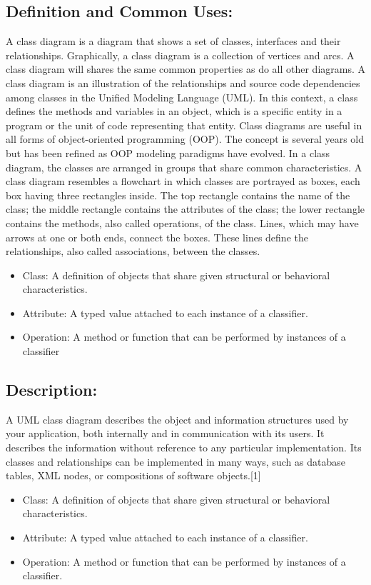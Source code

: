 \subsection{Definition and Common Uses:}
A class diagram is a diagram that shows a set of classes, interfaces and their relationships. Graphically, a class diagram is a collection of vertices and arcs. A class diagram will shares the same common properties as do all other diagrams.
A class diagram is an illustration of the relationships and source code dependencies among classes in the Unified Modeling Language (UML). In this context, a class defines the methods and variables in an object, which is a specific entity in a program or the unit of code representing that entity. Class diagrams are useful in all forms of object-oriented programming (OOP). The concept is several years old but has been refined as OOP modeling paradigms have evolved.
In a class diagram, the classes are arranged in groups that share common characteristics. A class diagram resembles a flowchart in which classes are portrayed as boxes, each box having three rectangles inside. The top rectangle contains the name of the class; the middle rectangle contains the attributes of the class; the lower rectangle contains the methods, also called operations, of the class. Lines, which may have arrows at one or both ends, connect the boxes. These lines define the relationships, also called associations, between the classes.
\begin{itemize}
\item Class: A definition of objects that share given structural or behavioral characteristics.
\item Attribute: A typed value attached to each instance of a classifier.
\item Operation: A method or function that can be performed by instances of a classifier
\end{itemize}

\subsection{Description:}
A UML class diagram describes the object and information structures used by your application, both internally and in communication with its users. It describes the information without reference to any particular implementation. Its classes and relationships can be implemented in many ways, such as database tables, XML nodes, or compositions of software objects.[1]
\begin{itemize}
 \item                 Class: A definition of objects that share given structural or behavioral characteristics.
 \item               Attribute: A typed value attached to each instance of a classifier.
 \item                Operation: A method or function that can be performed by instances of a classifier.
\end{itemize}

